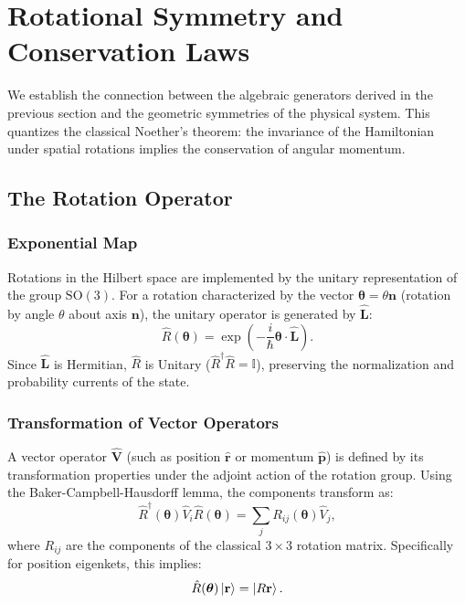 \section{Rotational Symmetry and Conservation Laws}

We establish the connection between the algebraic generators derived in the
previous section and the geometric symmetries of the physical system. This
quantizes the classical Noether's theorem: the invariance of the Hamiltonian
under spatial rotations implies the conservation of angular momentum.

\subsection{The Rotation Operator}

\subsubsection{Exponential Map}
Rotations in the Hilbert space are implemented by the unitary representation of
the group $\mathrm{SO}(3)$. For a rotation characterized by the vector $\boldsymbol{\theta}
= \theta \mathbf{n}$ (rotation by angle $\theta$ about axis $\mathbf{n}$), the
unitary operator is generated by $\hat{\mathbf{L}}$:
\begin{equation}
  \hat{R}(\boldsymbol{\theta}) = \exp\left(-\frac{i}{\hbar}
  \boldsymbol{\theta} \cdot \hat{\mathbf{L}}\right).
\end{equation}
Since $\hat{\mathbf{L}}$ is Hermitian, $\hat{R}$ is Unitary ($\hat{R}^\dagger
\hat{R} = \mathbb{I}$), preserving the normalization and probability currents of
the state.

\subsubsection{Transformation of Vector Operators}
A vector operator $\hat{\mathbf{V}}$ (such as position $\hat{\mathbf{r}}$ or
momentum $\hat{\mathbf{p}}$) is defined by its transformation properties under
the adjoint action of the rotation group. Using the Baker-Campbell-Hausdorff
lemma, the components transform as:
\begin{equation}
  \hat{R}^\dagger(\boldsymbol{\theta}) \hat{V}_i \hat{R}(\boldsymbol{\theta})
  = \sum_{j} R_{ij}(\boldsymbol{\theta}) \hat{V}_j,
\end{equation}
where $R_{ij}$ are the components of the classical $3\times3$ rotation matrix.
Specifically for position eigenkets, this implies:
\begin{equation}
  \hat{R}(\boldsymbol{\theta})\ket{\mathbf{r}} = \ket{R\mathbf{r}}.
\end{equation}

